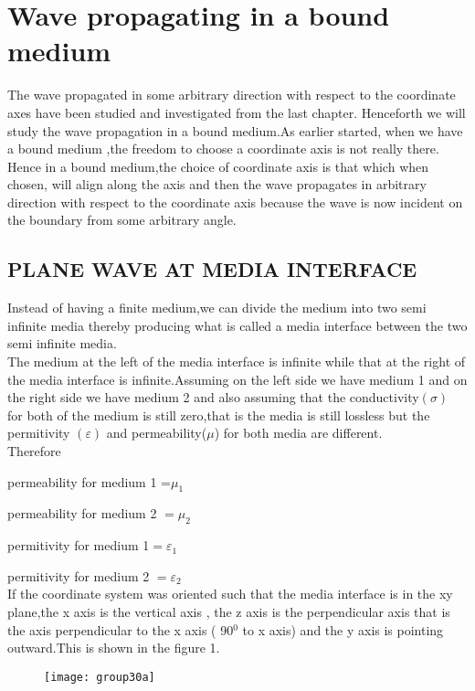 \chapter{Wave propagating in a bound medium}
The wave propagated in some  arbitrary direction with respect to the coordinate axes have been studied and investigated from the last chapter. Henceforth we will study the wave propagation in a bound medium.As earlier started, when we have a bound medium ,the freedom to choose a coordinate axis is not really there. Hence in a bound medium,the choice of coordinate axis is that which when chosen, will align along the axis and then the wave propagates in arbitrary direction with respect to the coordinate axis because the wave is now incident on the boundary from some arbitrary angle.\\


\section{PLANE WAVE AT MEDIA INTERFACE}


Instead of having a finite medium,we can divide the medium into two semi infinite media thereby producing what is called a media interface between the two semi infinite media.\\The medium at the left of the media interface is infinite while that at the right of the media interface is infinite.Assuming on the left side we have medium 1 and on the right side we have medium 2 and also assuming that the conductivity$(\sigma)$ for both of the medium is still zero,that is the media  is still lossless but  the permitivity $(\varepsilon)$ and permeability($\mu$) for both media are different.\\Therefore


permeability for medium 1 =$\mu_1$ 

permeability for medium 2 $=\mu_2$

permitivity for medium 1$=\varepsilon_1$

permitivity for medium 2 $=\varepsilon_2$\\

If the coordinate system  was oriented such that the media interface is in  the xy plane,the x axis is the vertical axis , the z axis is the perpendicular axis that is  the axis perpendicular to the x axis ( 90$^{0}$ to x axis) and the y axis is pointing outward.This is shown in the  figure 1.
\begin{figure}
\centering
\texttt{[image: group30a]}
\caption{}
\label{fig:group30a}
\end{figure}


